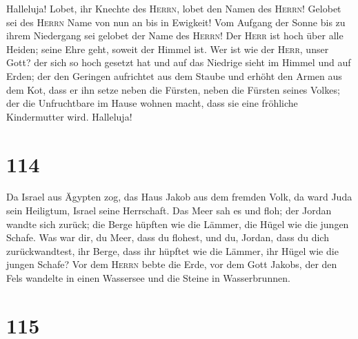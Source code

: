  Halleluja! Lobet, ihr Knechte des \textsc{Herrn}, lobet
den Namen des \textsc{Herrn}!  Gelobet sei des
\textsc{Herrn} Name von nun an bis in Ewigkeit!  Vom
Aufgang der Sonne bis zu ihrem Niedergang sei gelobet der Name des
\textsc{Herrn}!  Der \textsc{Herr} ist hoch über alle
Heiden; seine Ehre geht, soweit der Himmel ist.  Wer ist
wie der \textsc{Herr}, unser Gott? der sich so hoch gesetzt hat
 und auf das Niedrige sieht im Himmel und auf Erden;
 der den Geringen aufrichtet aus dem Staube und erhöht den
Armen aus dem Kot,  dass er ihn setze neben die Fürsten,
neben die Fürsten seines Volkes;  der die Unfruchtbare im
Hause wohnen macht, dass sie eine fröhliche Kindermutter wird.
Halleluja!

\hypertarget{section-113}{%
\section{114}\label{section-113}}

 Da Israel aus Ägypten zog, das Haus Jakob aus dem fremden
Volk,  da ward Juda sein Heiligtum, Israel seine
Herrschaft.  Das Meer sah es und floh; der Jordan wandte
sich zurück;  die Berge hüpften wie die Lämmer, die Hügel
wie die jungen Schafe.  Was war dir, du Meer, dass du
flohest, und du, Jordan, dass du dich zurückwandtest,  ihr
Berge, dass ihr hüpftet wie die Lämmer, ihr Hügel wie die jungen Schafe?
 Vor dem \textsc{Herrn} bebte die Erde, vor dem Gott
Jakobs,  der den Fels wandelte in einen Wassersee und die
Steine in Wasserbrunnen.

\hypertarget{section-114}{%
\section{115}\label{section-114}}

